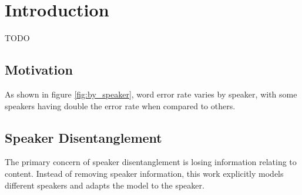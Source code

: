 \section{Introduction}

TODO
\subsection{Motivation}

As shown in figure \ref{fig:by_speaker}, word error rate varies by speaker, with some speakers having double the error rate when compared to others.

\subsection{Speaker Disentanglement}

The primary concern of speaker disentanglement is losing information relating to content.
Instead of removing speaker information, this work explicitly models different speakers and adapts the model to the speaker.

